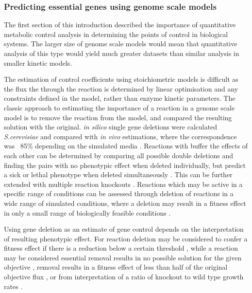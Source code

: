 
\subsubsection{Predicting essential genes using genome scale models}

The first section of this introduction described the importance of quantitative metabolic control analysis in determining the points of control in biological systems. The larger size of genome scale models would mean that quantitative analysis of this type would yield much greater datasets than similar analysis in smaller kinetic models.

The estimation of control coefficients using stoichiometric models is difficult as the flux the through the reaction is determined by linear optimisation and any constraints defined in the model, rather than enzyme kinetic parameters. The classic approach to estimating the importance of a reaction in a genome scale model is to remove the reaction from the model, and compared the resulting solution with the original. \emph{in silico} single gene deletions were calculated \emph{S.cerevisiae} and compared with \emph{in vivo} estimations, where the correspondence was ~85\% depending on the simulated media \cite{famili2003,forster2003}. Reactions with buffer the effects of each other can be determined by comparing all possible double deletions and finding the pairs with no phenotypic effect when deleted individually, but predict a sick or lethal phenotype when deleted simultaneously \cite{harrison2007}. This can be further extended with multiple reaction knockouts \cite{deutscher2008}. Reactions which may be active in a specific range of conditions can be assessed through deletion of reactions in a wide range of simulated conditions, where a deletion may result in a fitness effect in only a small range of biologically feasible conditions \cite{papp2004}.

Using gene deletion as an estimate of gene control depends on the interpretation of resulting phenotypic effect. For reaction deletion may be considered to confer a fitness effect if there is a reduction below a certain threshold \cite{pal2006}, while a reaction may be considered essential removal results in no possible solution for the given objective \cite{becker2008}, removal results in a fitness effect of less than half of the original objective flux \cite{papp2004}, or from interpretation of a ratio of knockout to wild type growth rates \cite{wang2009}.


